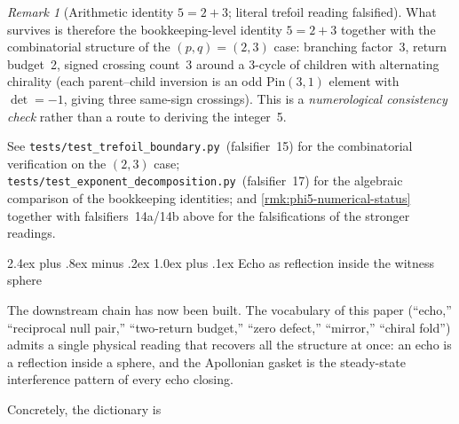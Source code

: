 \documentclass[11pt,a4paper]{article}
\makeatletter
\theoremstyle{plain}
\theoremstyle{definition}
\theoremstyle{remark}
\newtheorem{remark}[theorem]{Remark}
\numberwithin{equation}{section}
\renewcommand{\subsection}{%
  \@startsection{subsection}{2}{0pt}%
    {2.4ex plus .8ex minus .2ex}%
    {1.0ex plus .1ex}%
    {\normalfont\Large\bfseries\color{headingAccent}}%
}
\makeatother
\begin{document}
\begin{remark}[Arithmetic identity \(5=2+3\); literal trefoil reading
falsified]
What survives is therefore the bookkeeping-level identity \(5=2+3\)
together with the combinatorial structure of the
\((p,q)=(2,3)\) case: branching factor~3, return budget~2, signed
crossing count~3 around a 3-cycle of children with alternating
chirality (each parent--child inversion is an odd Pin\((3,1)\)
element with \(\det=-1\), giving three same-sign crossings).  This
is a \emph{numerological consistency check} rather than a route to
deriving the integer~5.

See \texttt{tests/test\_trefoil\_boundary.py}\ (falsifier~15) for
the combinatorial verification on the \((2,3)\) case;
\texttt{tests/test\_exponent\_decomposition.py}\ (falsifier~17) for
the algebraic comparison of the bookkeeping identities; and
\cref{rmk:phi5-numerical-status} together with falsifiers~14a/14b
above for the falsifications of the stronger readings.
\end{remark}

\subsection{Echo as reflection inside the witness sphere}
\label{subsec:echo-as-reflection}

The downstream chain has now been built.  The vocabulary of this paper
(``echo,'' ``reciprocal null pair,'' ``two-return budget,'' ``zero
defect,'' ``mirror,'' ``chiral fold'') admits a single physical reading
that recovers all the structure at once: an echo is a reflection inside
a sphere, and the Apollonian gasket is the steady-state interference
pattern of every echo closing.

Concretely, the dictionary is
\end{document}
